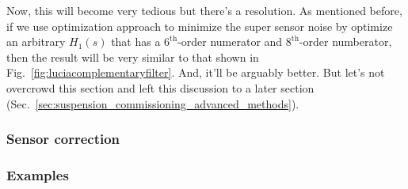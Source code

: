 Now, this will become very tedious but there's a resolution.
As mentioned before, if we use optimization approach to minimize the super sensor noise by optimize an arbitrary $H_1(s)$ that has a $6^\mathrm{th}$-order numerator and $8^\mathrm{th}$-order numberator, then the result will be very similar to that shown in Fig.~\ref{fig:luciacomplementaryfilter}.
And, it'll be arguably better.
But let's not overcrowd this section and left this discussion to a later section (Sec.~\ref{sec:suspension_commissioning_advanced_methods}).

\subsubsection{Sensor correction \label{sec:sensor_correction}}
\subsubsection{Examples \label{sec:sensor_fusion_examples}}